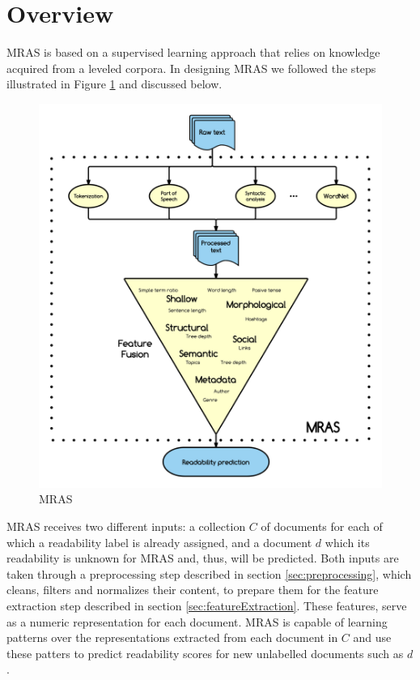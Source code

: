 \documentclass{bsu-ms}
\newcommand{\projectName}{ MRAS }
\begin{document}
\section{Overview}


\projectName is based on a supervised learning approach that relies on knowledge acquired from a leveled corpora. In designing \projectName we followed the steps illustrated in Figure \ref{fig:pipeline} and discussed below.



\begin{figure}[h!]
\centering
\includegraphics[width=\textwidth]{pipelineGraph}
\caption{\projectName}
\label{fig:pipeline}
\end{figure}



\projectName receives two different inputs: a collection $C$ of documents for each of which a readability label is already assigned, and a document $d$ which its readability is unknown for \projectName and, thus, will be predicted. Both inputs are taken through a preprocessing step described in section \ref{sec:preprocessing}, which cleans, filters and normalizes their content, to prepare them for the feature extraction step described in section \ref{sec:featureExtraction}. These features, serve as a numeric representation for each document. \projectName is capable of learning patterns over the representations extracted from each document in $C$ and use these patters to predict readability scores for new unlabelled documents such as $d$.
\end{document}
